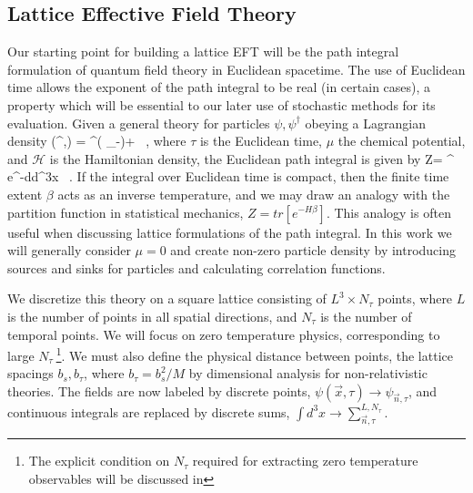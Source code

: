\subsection{\label{sec:LEFT}Lattice Effective Field Theory}

Our starting point for building a lattice EFT will be the path integral formulation of quantum field theory in Euclidean spacetime. The use of Euclidean time allows the exponent of the path integral to be real (in certain cases), a property which will be essential to our later use of stochastic methods for its evaluation. Given a general theory for particles $\psi,\psi^{\dagger}$ obeying a Lagrangian density \beq 
{}(\psi^{\dagger},\psi) = \psi^{\dagger}\left( \partial_{\tau}-\mu \right)\psi+ \left[\psi^{\dagger}, \psi\right] \ ,
\eeq
where $\tau$ is the Euclidean time, $\mu$ the chemical potential, and $\mathcal{H}$ is the Hamiltonian density, the Euclidean path integral is given by
\beq
Z=\int {} \psi^{\dagger} \psi e^{-\int d\tau d^3x} \ .
\eeq
If the integral over Euclidean time is compact, then the finite time extent $\beta$ acts as an inverse temperature, and we may draw an analogy with the partition function in statistical mechanics, $Z = tr\left[e^{-H\beta}\right]$. This analogy is often useful when discussing lattice formulations of the path integral. In this work we will generally consider $\mu=0$ and create non-zero particle density by introducing sources and sinks for particles and calculating correlation functions. 

We discretize this theory on a square lattice consisting of $L^3 \times N_{\tau}$ points, where $L$ is the number of points in all spatial directions, and $N_{\tau}$ is the number of temporal points. We will focus on zero temperature physics, corresponding to large $N_{\tau} ~$\footnote{The explicit condition on $N_{\tau}$ required for extracting zero temperature observables will be discussed in }. We must also define the physical distance between points, the lattice spacings $b_s, b_{\tau}$, where $b_{\tau} = b_s^2/M$ by dimensional analysis for non-relativistic theories. The fields are now labeled by discrete points, $\psi(\vec{x},\tau) \to \psi_{\vec{n},\tau}$, and continuous integrals are replaced by discrete sums, $\int d^3x \to \sum_{\vec{n},\tau}^{L,N_{\tau}}$.

